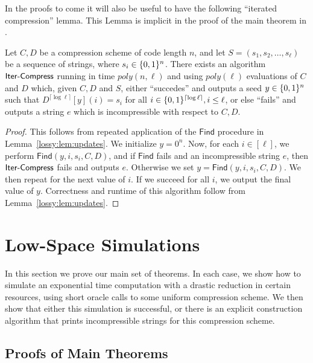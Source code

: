 In the proofs to come it will also be useful to have the following ``iterated compression'' lemma. This Lemma is implicit in the proof of the main theorem in \cite{Korten}.
\begin{lemma}\label{lossy:lem:compress}
 Let $C,D$ be a compression scheme of code length $n$, and let $S = (s_1, s_2, \ldots, s_{\ell})$ be a sequence of strings, where $s_i \in \{0,1\}^n$. There exists an algorithm $\mathsf{Iter\text{-} Compress}$ running in time $poly(n,\ell)$ and using $poly(\ell)$ evaluations of $C$ and $D$ which, given $C,D$ and $S$, either ``succedes'' and outputs a seed $y \in \{0,1\}^n$ such that $D^{\lceil \log \ell \rceil}[y](i) = s_i$ for all $i \in \{0,1\}^{\lceil \log \ell \rceil}, i \leq \ell$, or else ``fails'' and outputs a string $e$ which is incompressible with respect to $C,D$.
\end{lemma}
\begin{proof}
This follows from repeated application of the $\mathsf{Find}$ procedure in Lemma~\ref{lossy:lem:updates}. We initialize $y=0^n$. Now, for each $i \in [\ell]$, we perform $\mathsf{Find}(y,i,s_i,C,D)$, and if $\mathsf{Find}$ fails and an incompressible string $e$, then $\mathsf{Iter\text{-} Compress}$ fails and outputs $e$. Otherwise we set $y = \mathsf{Find}(y,i,s_i,C,D)$. We then repeat for the next value of $i$. If we succeed for all $i$, we output the final value of $y$. Correctness and runtime of this algorithm follow from Lemma~\ref{lossy:lem:updates}.
\end{proof}

\section{Low-Space Simulations}\label{lossy:sec:low-space}
In this section we prove our main set of theorems. In each case, we show how to simulate an exponential time computation with a drastic reduction in certain resources, using short oracle calls to some uniform compression scheme. We then show that either this simulation is successful, or there is an explicit construction algorithm that prints incompressible strings for this compression scheme.


\subsection{Proofs of Main Theorems}\label{lossy:subsec:main-proofs}

